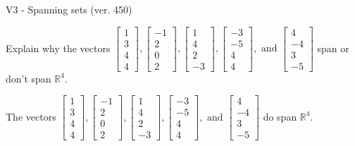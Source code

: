 \begin{exercise}
  \begin{exerciseTitle}V3 - Spanning sets (ver. 450)\end{exerciseTitle}
  \begin{exerciseStatement}
    Explain why the vectors \(\left[\begin{array}{r}
1 \\
3 \\
4 \\
4
\end{array}\right] , \left[\begin{array}{r}
-1 \\
2 \\
0 \\
2
\end{array}\right] , \left[\begin{array}{r}
1 \\
4 \\
2 \\
-3
\end{array}\right] , \left[\begin{array}{r}
-3 \\
-5 \\
4 \\
4
\end{array}\right] , \text{ and } \left[\begin{array}{r}
4 \\
-4 \\
3 \\
-5
\end{array}\right]\) span or don't span \(\mathbb{R}^4\). 
	


  \end{exerciseStatement}
  \begin{exerciseAnswer}
   The vectors \(\left[\begin{array}{r}
1 \\
3 \\
4 \\
4
\end{array}\right] , \left[\begin{array}{r}
-1 \\
2 \\
0 \\
2
\end{array}\right] , \left[\begin{array}{r}
1 \\
4 \\
2 \\
-3
\end{array}\right] , \left[\begin{array}{r}
-3 \\
-5 \\
4 \\
4
\end{array}\right] , \text{ and } \left[\begin{array}{r}
4 \\
-4 \\
3 \\
-5
\end{array}\right]\) 
  	 do  
	span \(\mathbb{R}^4\).
  


  \end{exerciseAnswer}
\end{exercise}